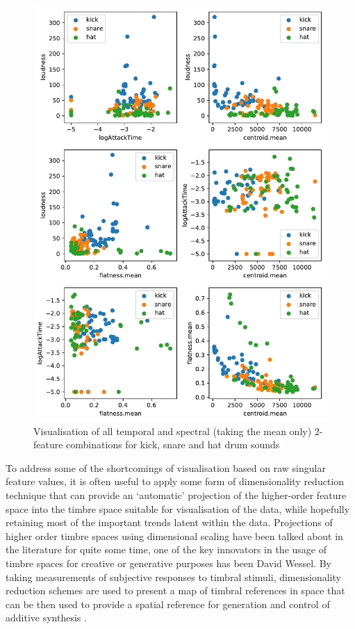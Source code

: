 \begin{figure}
	\begin{center}
		\includegraphics[width=1.0\textwidth]{ch06_rhythmcat/figures/feature_axis_combos.pdf}
	\end{center}
	\caption[Visualisation of all temporal and spectral feature combinations for kick, snare and hat drum sounds]{Visualisation of all temporal and spectral (taking the mean only) 2-feature combinations for kick, snare and hat drum sounds}
	\label{fig:temporal_and_spectral_features}
\end{figure}


To address some of the shortcomings of visualisation based on raw singular feature values, it is often useful to apply some form of dimensionality reduction technique that can provide an `automatic' projection of the higher-order feature space into the timbre space suitable for visualisation of the data, while hopefully retaining most of the important trends latent within the data. Projections of higher order timbre spaces using dimensional scaling have been talked about in the literature for quite some time, one of the key innovators in the usage of timbre spaces for creative or generative purposes has been David Wessel. By taking measurements of subjective responses to timbral stimuli, dimensionality reduction schemes are used to present a map of timbral references in space that can be then used to provide a spatial reference for generation and control of additive synthesis \citep{Wessel1979, Wessel1976}.

